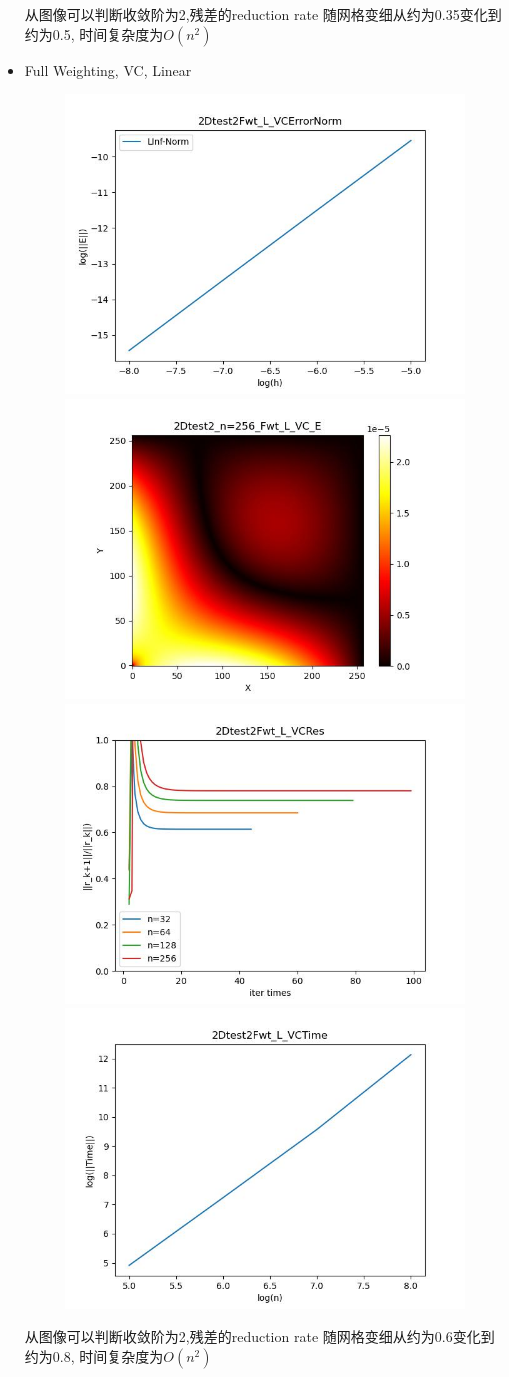 \documentclass{article}
\begin{document}
\begin{itemize}
    从图像可以判断收敛阶为2,残差的reduction rate 随网格变细从约为0.35变化到约为0.5, 时间复杂度为$O(n^2)$
    \newpage
    \item Full Weighting, VC, Linear
    \begin{figure}[h]
        \centering
        \includegraphics[width=0.35\linewidth]{2Dtest2Fwt_L_VCErrorNorm.jpg}
        \includegraphics[width=0.35\linewidth]{2Dtest2_n=256_Fwt_L_VC_E.jpg}
        \includegraphics[width=0.35\linewidth]{2Dtest2Fwt_L_VCRes.jpg}
        \includegraphics[width=0.35\linewidth]{2Dtest2Fwt_L_VCTime.jpg}
    \end{figure}
    
    从图像可以判断收敛阶为2,残差的reduction rate 随网格变细从约为0.6变化到约为0.8, 时间复杂度为$O(n^2)$
    

\end{itemize}
\end{document}
